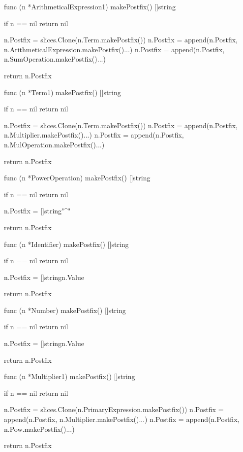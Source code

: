 func (n *ArithmeticalExpression1) makePostfix() []string {
	if n == nil {
		return nil
	}

	n.Postfix = slices.Clone(n.Term.makePostfix())
	n.Postfix = append(n.Postfix, n.ArithmeticalExpression.makePostfix()...)
	n.Postfix = append(n.Postfix, n.SumOperation.makePostfix()...)

	return n.Postfix
}

func (n *Term1) makePostfix() []string {
	if n == nil {
		return nil
	}

	n.Postfix = slices.Clone(n.Term.makePostfix())
	n.Postfix = append(n.Postfix, n.Multiplier.makePostfix()...)
	n.Postfix = append(n.Postfix, n.MulOperation.makePostfix()...)

	return n.Postfix
}

func (n *PowerOperation) makePostfix() []string {
	if n == nil {
		return nil
	}

	n.Postfix = []string{"^"}

	return n.Postfix
}

func (n *Identifier) makePostfix() []string {
	if n == nil {
		return nil
	}

	n.Postfix = []string{n.Value}

	return n.Postfix
}

func (n *Number) makePostfix() []string {
	if n == nil {
		return nil
	}

	n.Postfix = []string{n.Value}

	return n.Postfix
}

func (n *Multiplier1) makePostfix() []string {
	if n == nil {
		return nil
	}

	n.Postfix = slices.Clone(n.PrimaryExpression.makePostfix())
	n.Postfix = append(n.Postfix, n.Multiplier.makePostfix()...)
	n.Postfix = append(n.Postfix, n.Pow.makePostfix()...)

	return n.Postfix
}

